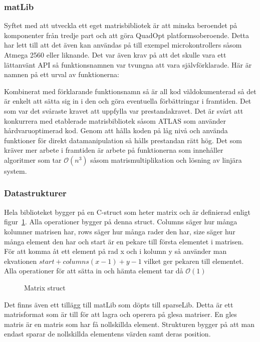 \subsubsection{matLib}
Syftet med att utveckla ett eget matrisbibliotek är att minska beroendet på komponenter från tredje part och att göra QuadOpt platformsoberoende. Detta har lett till att det även kan användas på till exempel microkontrollers såsom Atmega 2560 eller liknande.
Det var även krav på att det skulle vara ett lättanvänt API så funktionsnamnen var tvungna att vara självförklarade. Här är namnen på ett urval av funktionerna:

Kombinerat med förklarande funktionsnamn så är all kod väldokumenterad så det är enkelt att sätta sig in i den och göra eventuella förbättringar i framtiden.
\newline
\newline
Det som var det svåraste kravet att uppfylla var prestandakravet. Det är svårt att konkurrera med etablerade matrisbibliotek såsom ATLAS som använder hårdvaruoptimerad kod. Genom att hålla koden på låg nivå och använda funktioner för direkt datamanipulation så hålls prestandan rätt hög. Det som kräver mer arbete i framtiden är arbete på funktionerna som innehåller algoritmer som tar $\mathcal{O}(n^3)$ såsom matrismultiplikation och lösning av linjära system.



\subsubsection{Datastrukturer}
Hela biblioteket bygger på en C-struct som heter matrix och är definierad enligt figur~\ref{fig:matrix_struct}. Alla operationer bygger på denna struct. Columns säger hur många kolumner matrisen har, rows säger hur många rader den har, size säger hur många element den har och start är en pekare till första elementet i matrisen. För att komma åt ett element på rad x och i kolumn y så använder man ekvationen $start+columns(x-1)+y-1$ vilket ger pekaren till elementet. Alla operationer för att sätta in och hämta element tar då $\mathcal{O}(1)$
\begin{figure}[H]

\caption{Matrix struct}
\label{fig:matrix_struct}
\end{figure}


Det finns även ett tillägg till matLib som döpts till sparseLib. Detta är ett matrisformat som är till för att lagra och operera på glesa matriser. En gles matris är en matris som har få nollskillda element. Strukturen bygger på att man endast sparar de nollskillda elementens värden samt deras position. 

